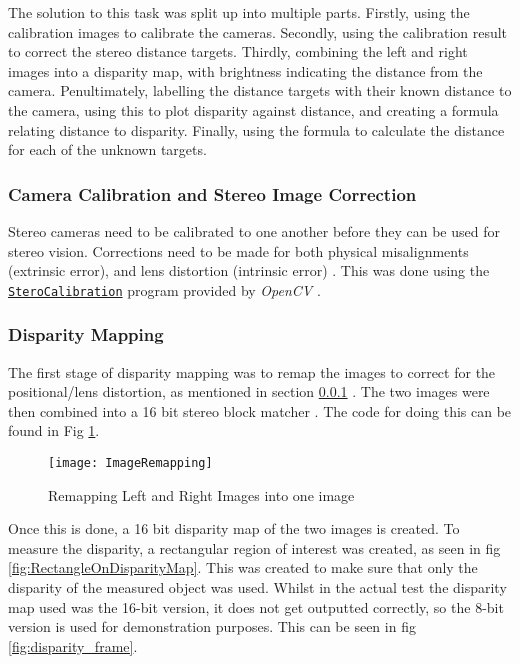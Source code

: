 \documentclass[conference]{IEEEtran}
\begin{document}
The solution to this task was split up into multiple parts. Firstly, using the calibration images to calibrate the cameras. Secondly, using the calibration result to correct the stereo distance targets. Thirdly, combining the left and right images into a disparity map, with brightness indicating the distance from the camera. Penultimately, labelling the distance targets with their known distance to the camera, using this to plot disparity against distance, and creating a formula relating distance to disparity. Finally, using the formula to calculate the distance for each of the unknown targets.

\subsubsection{Camera Calibration and Stereo Image Correction} \label{Camera_Calibration}

Stereo cameras need to be calibrated to one another before they can be used for stereo vision. Corrections need to be made for both physical misalignments (extrinsic error), and lens distortion (intrinsic error) \cite{Stero_Calibration}. This was done using the \href{https://docs.opencv.org/2.4/modules/calib3d/doc/camera_calibration_and_3d_reconstruction.html?highlight=stereocalibration}{\texttt{SteroCalibration}} program provided by \textit{OpenCV} \cite{Book_Calibration}.


\subsubsection{Disparity Mapping} \label{Disparity_Mapping}

The first stage of disparity mapping was to remap the images to correct for the positional/lens distortion, as mentioned in section \ref{Camera_Calibration} \cite{OpenCV_Remapping}. The two images were then combined into a 16 bit stereo block matcher \cite{Stereo_Block_Matching}. The code for doing this can be found in Fig \ref{fig:ImageRemapping}.

\begin{figure}[H]
\centerline{\texttt{[image: ImageRemapping]}}
\caption{Remapping Left and Right Images into one image}
\label{fig:ImageRemapping}
\end{figure}

Once this is done, a 16 bit disparity map of the two images is created. To measure the disparity, a rectangular region of interest was created, as seen in fig \ref{fig:RectangleOnDisparityMap}. This was created to make sure that only the disparity of the measured object was used. Whilst in the actual test the disparity map used was the 16-bit version, it does not get outputted correctly, so the 8-bit version is used for demonstration purposes. This can be seen in fig \ref{fig:disparity_frame}.
\end{document}
